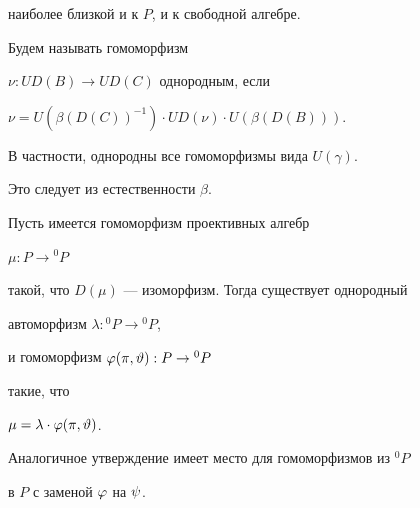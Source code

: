 наиболее близкой и к $P$, и к свободной алгебре.





Будем называть гомоморфизм


$\nu :UD(B)\to UD(C)$ однородным, если


$\nu=U(\beta(D(C))^{-1})\cdot UD(\nu) \cdot U(\beta(D(B)))$.


В частности, однородны все гомоморфизмы вида $U(\gamma)$.


Это следует из естественности $\beta$.





\begin{cor}


Пусть имеется гомоморфизм проективных алгебр


$\mu : P\to {}^0 P$


такой, что $D(\mu)$ --- изоморфизм. Тогда существует однородный


автоморфизм $\lambda : {}^0 P\to {}^0 P $,


и гомоморфизм $\varphi(\pi,\vartheta) : P\to {}^0 P$


такие, что


$\mu=\lambda\cdot \varphi(\pi,\vartheta)$.


Аналогичное утверждение имеет место для гомоморфизмов из ${}^0 P$


в $P$ с заменой $\varphi$ на $\psi$.


\end{cor}






